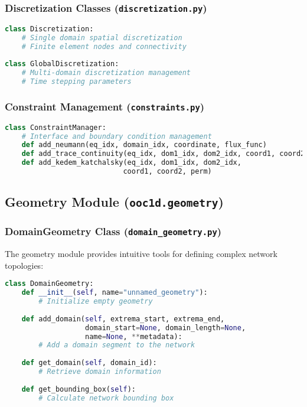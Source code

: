 \documentclass[11pt,a4paper]{article}
\newcommand{\code}[1]{\texttt{#1}}
\begin{document}
\subsubsection{Discretization Classes (\code{discretization.py})}

\begin{lstlisting}[language=Python, caption={Discretization Classes}]
class Discretization:
    # Single domain spatial discretization
    # Finite element nodes and connectivity
    
class GlobalDiscretization:
    # Multi-domain discretization management
    # Time stepping parameters
\end{lstlisting}

\subsubsection{Constraint Management (\code{constraints.py})}

\begin{lstlisting}[language=Python, caption={Constraint Manager Methods}]
class ConstraintManager:
    # Interface and boundary condition management
    def add_neumann(eq_idx, domain_idx, coordinate, flux_func)
    def add_trace_continuity(eq_idx, dom1_idx, dom2_idx, coord1, coord2)
    def add_kedem_katchalsky(eq_idx, dom1_idx, dom2_idx, 
                            coord1, coord2, perm)
\end{lstlisting}

\subsection{Geometry Module (\code{ooc1d.geometry})}

\subsubsection{DomainGeometry Class (\code{domain\_geometry.py})}

The geometry module provides intuitive tools for defining complex network topologies:

\begin{lstlisting}[language=Python, caption={DomainGeometry Class}]
class DomainGeometry:
    def __init__(self, name="unnamed_geometry"):
        # Initialize empty geometry
    
    def add_domain(self, extrema_start, extrema_end, 
                   domain_start=None, domain_length=None, 
                   name=None, **metadata):
        # Add a domain segment to the network
        
    def get_domain(self, domain_id):
        # Retrieve domain information
        
    def get_bounding_box(self):
        # Calculate network bounding box
\end{lstlisting}
\end{document}
